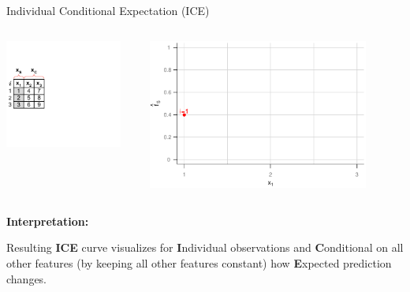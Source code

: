 \documentclass[11pt,compress,t,notes=noshow, aspectratio=169, xcolor=table]{beamer}
\begin{document}
\begin{frame}{Individual Conditional Expectation (ICE)}

\begin{columns}[T]
\begin{column}{0.4\textwidth}
\includegraphics[page=5, trim=0cm 0.35cm 0.85cm 0.35cm, width=0.9\textwidth]{figure_man/ice_plot_demo}
\end{column}
\begin{column}{0.55\textwidth}
\includegraphics[page=3, width=0.85\textwidth]{figure/ICE}
\end{column}
\end{columns}
\vspace*{\topsep}

\textbf{Interpretation:}

Resulting \textbf{ICE} curve visualizes for \textbf{I}ndividual observations and \textbf{C}onditional on all other features (by keeping all other features constant) how \textbf{E}xpected prediction changes.
\end{frame}
\end{document}
